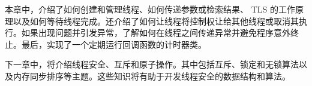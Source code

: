 

本章中，介绍了如何创建和管理线程、如何传递参数或检索结果、 TLS 的工作原理以及如何等待线程完成。还介绍了如何让线程将控制权让给其他线程或取消其执行。如果出现问题并引发异常，了解如何在线程之间传递异常并避免程序意外终止。最后，实现了一个定期运行回调函数的计时器类。

下一章中，将介绍线程安全、互斥和原子操作。其中包括互斥、锁定和无锁算法以及内存同步排序等主题。这些知识将有助于开发线程安全的数据结构和算法。